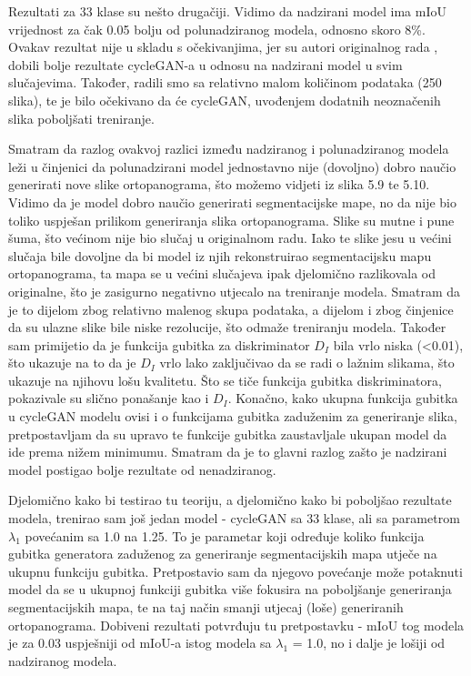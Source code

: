 \noindent Rezultati za 33 klase su nešto drugačiji. Vidimo da nadzirani model ima mIoU vrijednost za čak 0.05 bolju od polunadziranog modela, odnosno skoro 8\%. Ovakav rezultat nije u skladu s očekivanjima, jer su autori originalnog rada \citep{cycleGANSegmentation}, dobili bolje rezultate cycleGAN-a u odnosu na nadzirani model u svim slučajevima. Također, radili smo sa relativno malom količinom podataka (250 slika), te je bilo očekivano da će cycleGAN, uvođenjem dodatnih neoznačenih slika poboljšati treniranje. 

Smatram da razlog ovakvoj razlici između nadziranog i polunadziranog modela leži u činjenici da polunadzirani model jednostavno nije (dovoljno) dobro naučio generirati nove slike ortopanograma, što možemo vidjeti iz slika 5.9 te 5.10. Vidimo da je model dobro naučio generirati segmentacijske mape, no da nije bio toliko uspješan prilikom generiranja slika ortopanograma. Slike su mutne i pune šuma, što većinom nije bio slučaj u originalnom radu. Iako te slike jesu u većini slučaja bile dovoljne da bi model iz njih rekonstruirao segmentacijsku mapu ortopanograma, ta mapa se u većini slučajeva ipak djelomično razlikovala od originalne, što je zasigurno negativno utjecalo na treniranje modela. Smatram da je to dijelom zbog relativno malenog skupa podataka, a dijelom i zbog činjenice da su ulazne slike bile niske rezolucije, što odmaže treniranju modela. Također sam primijetio da je funkcija gubitka za diskriminator $D_{I}$ bila vrlo niska (<0.01), što ukazuje na to da je $D_{I}$ vrlo lako zaključivao da se radi o lažnim slikama, što ukazuje na njihovu lošu kvalitetu. Što se tiče funkcija gubitka diskriminatora, pokazivale su slično ponašanje kao i $D_{I}$.
Konačno, kako ukupna funkcija gubitka u cycleGAN modelu ovisi i o funkcijama gubitka zaduženim za generiranje slika, pretpostavljam da su upravo te funkcije gubitka zaustavljale ukupan model da ide prema nižem minimumu. Smatram da je to glavni razlog zašto je nadzirani model postigao bolje rezultate od nenadziranog. 

Djelomično kako bi testirao tu teoriju, a djelomično kako bi poboljšao rezultate modela, trenirao sam još jedan model - cycleGAN sa 33 klase, ali sa parametrom $\lambda_{1}$ povećanim sa 1.0 na 1.25. To je parametar koji određuje koliko funkcija gubitka generatora zaduženog za generiranje segmentacijskih mapa utječe na ukupnu funkciju gubitka. Pretpostavio sam da njegovo povećanje može potaknuti model da se u ukupnoj funkciji gubitka više fokusira na poboljšanje generiranja segmentacijskih mapa, te na taj način smanji utjecaj (loše) generiranih ortopanograma. Dobiveni rezultati potvrđuju tu pretpostavku - mIoU tog modela je za 0.03 uspješniji od mIoU-a istog modela sa $\lambda_{1}$ = 1.0, no i dalje je lošiji od nadziranog modela.\\


